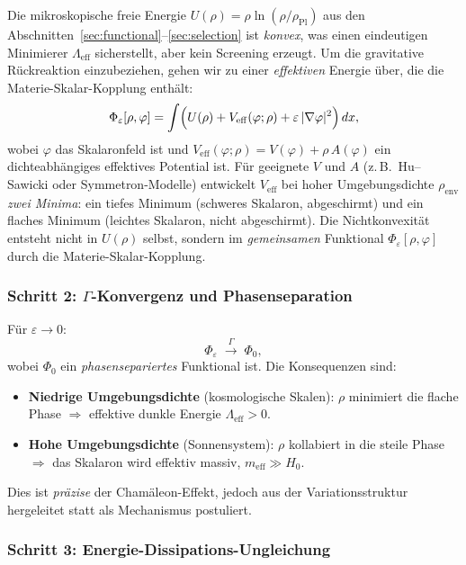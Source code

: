 \documentclass[12pt,a4paper]{article}
\theoremstyle{definition}
\theoremstyle{plain}
\theoremstyle{remark}
\begin{document}
Die mikroskopische freie Energie $U(\rho) = \rho\ln(\rho/\rho_{\mathrm{Pl}})$ aus den Abschnitten~\ref{sec:functional}--\ref{sec:selection} ist \emph{konvex}, was einen eindeutigen Minimierer $\Lambda_{\mathrm{eff}}$ sicherstellt, aber kein Screening erzeugt. Um die gravitative R\"uckreakti\-on einzubeziehen, gehen wir zu einer \emph{effektiven} Energie \"uber, die die Materie-Skalar-Kopplung enth\"alt:
\begin{equation}\label{eq:phi-eps-screening}
  \Phi_\varepsilon[\rho, \varphi] = \int \Bigl( U(\rho) + V_{\mathrm{eff}}(\varphi;\rho) + \varepsilon\,|\nabla\varphi|^2 \Bigr)\,dx,
\end{equation}
wobei $\varphi$ das Skalaronfeld ist und $V_{\mathrm{eff}}(\varphi;\rho) = V(\varphi) + \rho\,A(\varphi)$ ein dichteabh\"angiges effektives Potential ist. F\"ur geeignete $V$ und $A$ (z.\,B.\ Hu--Sawicki \cite{HuSawicki2007} oder Symmetron-Modelle) entwickelt $V_{\mathrm{eff}}$ bei hoher Umgebungsdichte $\rho_{\mathrm{env}}$ \emph{zwei Minima}: ein tiefes Minimum (schweres Skalaron, abgeschirmt) und ein flaches Minimum (leichtes Skalaron, nicht abgeschirmt). Die Nichtkonvexit\"at entsteht nicht in $U(\rho)$ selbst, sondern im \emph{gemeinsamen} Funktional $\Phi_\varepsilon[\rho,\varphi]$ durch die Materie-Skalar-Kopplung.

\subsubsection*{Schritt 2: $\Gamma$-Konvergenz und Phasenseparation}

F\"ur $\varepsilon \to 0$:
\[
  \Phi_\varepsilon \;\xrightarrow{\;\Gamma\;}\; \Phi_0,
\]
wobei $\Phi_0$ ein \emph{phasensepariertes} Funktional ist. Die Konsequenzen sind:
\begin{itemize}
\item \textbf{Niedrige Umgebungsdichte} (kosmologische Skalen): $\rho$ minimiert die flache Phase $\Rightarrow$ effektive dunkle Energie $\Lambda_{\mathrm{eff}} > 0$.
\item \textbf{Hohe Umgebungsdichte} (Sonnensystem): $\rho$ kollabiert in die steile Phase $\Rightarrow$ das Skalaron wird effektiv massiv, $m_{\mathrm{eff}} \gg H_0$.
\end{itemize}
Dies ist \emph{pr\"azise} der Cham\"aleon-Effekt, jedoch aus der Variationsstruktur hergeleitet statt als Mechanismus postuliert.

\subsubsection*{Schritt 3: Energie-Dissipations-Ungleichung}
\end{document}
